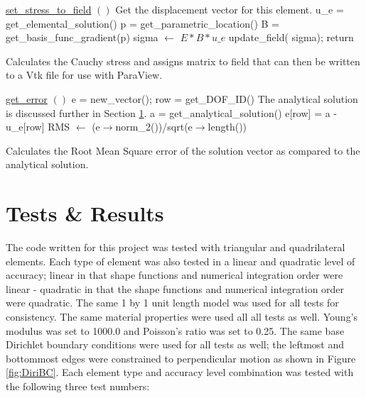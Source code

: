 \documentclass[a4paper, 12pt]{article}
\begin{document}
\vspace{\baselineskip}
\begin{algorithm}[H]
  \underline{set\_stress\_to\_field} $()$
  \BlankLine
  {
    \tcc
    {
      Get the displacement vector for this element.
    }
    u\_e = get\_elemental\_solution()\;
    {
      p = get\_parametric\_location()\;
      B = get\_basis\_func\_gradient(p)\;
      sigma $\leftarrow$ $E*B*u\_e$ \;
    }
    update\_field( sigma);
  }
  return\;
  \caption{Calculates the Cauchy stress and assigns matrix to field that
           can then be written to a Vtk file for use with ParaView.}
  \label{al:CauchyStress}
\end{algorithm}

\vspace{\baselineskip}
\begin{algorithm}[H]
  \underline{get\_error} $()$
  \BlankLine
  e = new\_vector();
  {
    {
      row = get\_DOF\_ID()\;
      \tcc
      {
        The analytical solution is discussed further in
        Section \ref{sec:testing}.
      }
      a = get\_analytical\_solution()\;
      e[row] = a - u\_e[row]\;
    }
  }
  RMS $\leftarrow$ (e$\rightarrow$norm\_2())/sqrt(e$\rightarrow$length())\;
  \caption{Calculates the Root Mean Square error of 
            the solution vector as compared to the analytical solution.}
  \label{al:getError}
\end{algorithm}
\vspace{\baselineskip}

\section{Tests \& Results} \label{sec:testing}
The code written for this project was tested with triangular and 
quadrilateral elements. Each type of element was also 
tested in a linear and quadratic level of accuracy;
linear in that shape functions and numerical integration 
order were linear - quadratic in that the shape functions and
numerical integration order were quadratic.
The same 1 by 1 unit length model was used for all tests for 
consistency. 
The same material properties were used all all tests as well.
Young's modulus was set to 1000.0 and Poisson's ratio
was set to 0.25.
The same base Dirichlet boundary conditions were used
for all tests as well; the leftmost and bottommost edges were 
constrained to perpendicular motion as shown in Figure \ref{fig:DiriBC}.
Each element type and accuracy level combination was tested with
the following three test numbers:
\end{document}
